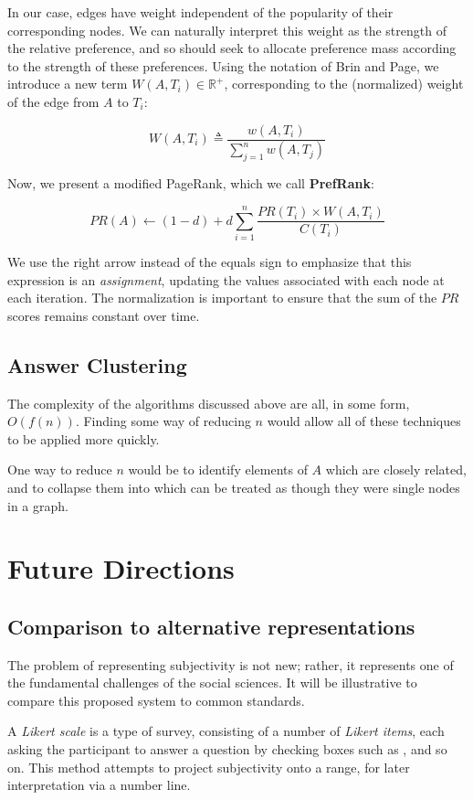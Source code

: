 \documentclass[12pt]{book}
\begin{document}
In our case, edges have weight independent of the popularity of their corresponding nodes.
We can naturally interpret this weight as the strength of the relative preference, and so should seek to allocate preference mass according to the strength of these preferences.
Using the notation of Brin and Page, we introduce a new term $W(A, T_i) \in \mathbb{R}^+$, corresponding to the (normalized) weight of the edge from $A$ to $T_i$:

\[
W(A, T_i) \triangleq \frac{w(A, T_i)}{\sum_{j=1}^n w(A, T_j)}
\]

Now, we present a modified PageRank, which we call \textbf{PrefRank}:

\[
PR(A) \leftarrow (1-d) + d \sum_{i=1}^n \frac{PR(T_i) \times W(A,T_i)}{C(T_i)}
\]

We use the right arrow instead of the equals sign to emphasize that this expression is an \textit{assignment}, updating the values associated with each node at each iteration.
The normalization is important to ensure that the sum of the $PR$ scores remains constant over time.


\subsection{Answer Clustering}

The complexity of the algorithms discussed above are all, in some form, $O(f(n))$.
Finding some way of reducing $n$ would allow all of these techniques to be applied more quickly.

One way to reduce $n$ would be to identify elements of $A$ which are closely related, and to collapse them into  which can be treated as though they were single nodes in a graph.

\section{Future Directions}

\subsection{Comparison to alternative representations}

The problem of representing subjectivity is not new; rather, it represents one of the fundamental challenges of the social sciences. It will be illustrative to compare this proposed system to common standards.

A \textit{Likert scale} is a type of survey, consisting of a number of \textit{Likert items}, each asking the participant to answer a question by checking boxes such as ,  and so on. This method attempts to project subjectivity onto a range, for later interpretation via a number line.
\end{document}

